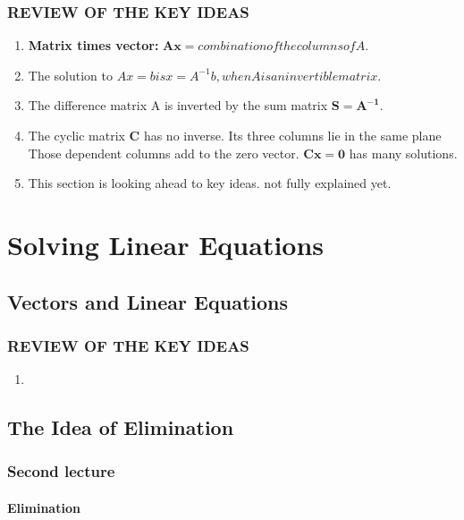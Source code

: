 \documentclass{book}
\begin{document}
\subsection*{REVIEW OF THE KEY IDEAS}
    \begin{enumerate}
        \item  \textbf{Matrix times vector:} \( \mathbf{Ax} = combination of the columns of A.\)
        \item The solution to \( Ax = b is x = A^{-1}b, when A is an invertible matrix.\)
        \item The difference matrix A is inverted by the sum matrix \( \mathbf{S = A^{-1}}\).
        \item The cyclic matrix \textbf{C} has no inverse. Its three columns lie in the same plane\\
        Those dependent columns add to the zero vector. \( \mathbf{Cx = 0}\) has many solutions.
        \item This section is looking ahead to key ideas. not fully explained yet.

    \end{enumerate}





\chapter{Solving Linear Equations}
\section{Vectors and Linear Equations}
\subsection*{REVIEW OF THE KEY IDEAS}
    \begin{enumerate}
        \item  
    \end{enumerate}

\section{The Idea of Elimination}
\subsection*{Second lecture}
    \subsubsection{Elimination}
\end{document}
